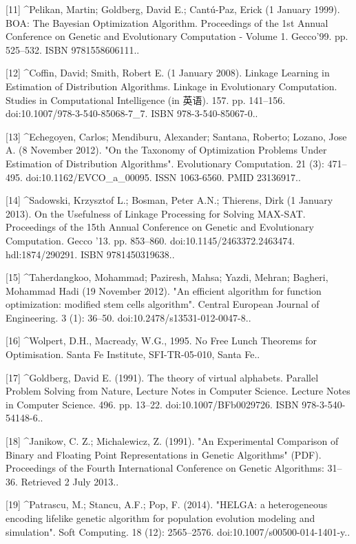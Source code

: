 [11]
^Pelikan, Martin; Goldberg, David E.; Cantú-Paz, Erick (1 January 1999). BOA: The Bayesian Optimization Algorithm. Proceedings of the 1st Annual Conference on Genetic and Evolutionary Computation - Volume 1. Gecco'99. pp. 525–532. ISBN 9781558606111..

[12]
^Coffin, David; Smith, Robert E. (1 January 2008). Linkage Learning in Estimation of Distribution Algorithms. Linkage in Evolutionary Computation. Studies in Computational Intelligence (in 英语). 157. pp. 141–156. doi:10.1007/978-3-540-85068-7_7. ISBN 978-3-540-85067-0..

[13]
^Echegoyen, Carlos; Mendiburu, Alexander; Santana, Roberto; Lozano, Jose A. (8 November 2012). "On the Taxonomy of Optimization Problems Under Estimation of Distribution Algorithms". Evolutionary Computation. 21 (3): 471–495. doi:10.1162/EVCO_a_00095. ISSN 1063-6560. PMID 23136917..

[14]
^Sadowski, Krzysztof L.; Bosman, Peter A.N.; Thierens, Dirk (1 January 2013). On the Usefulness of Linkage Processing for Solving MAX-SAT. Proceedings of the 15th Annual Conference on Genetic and Evolutionary Computation. Gecco '13. pp. 853–860. doi:10.1145/2463372.2463474. hdl:1874/290291. ISBN 9781450319638..

[15]
^Taherdangkoo, Mohammad; Paziresh, Mahsa; Yazdi, Mehran; Bagheri, Mohammad Hadi (19 November 2012). "An efficient algorithm for function optimization: modified stem cells algorithm". Central European Journal of Engineering. 3 (1): 36–50. doi:10.2478/s13531-012-0047-8..

[16]
^Wolpert, D.H., Macready, W.G., 1995. No Free Lunch Theorems for Optimisation. Santa Fe Institute, SFI-TR-05-010, Santa Fe..

[17]
^Goldberg, David E. (1991). The theory of virtual alphabets. Parallel Problem Solving from Nature, Lecture Notes in Computer Science. Lecture Notes in Computer Science. 496. pp. 13–22. doi:10.1007/BFb0029726. ISBN 978-3-540-54148-6..

[18]
^Janikow, C. Z.; Michalewicz, Z. (1991). "An Experimental Comparison of Binary and Floating Point Representations in Genetic Algorithms" (PDF). Proceedings of the Fourth International Conference on Genetic Algorithms: 31–36. Retrieved 2 July 2013..

[19]
^Patrascu, M.; Stancu, A.F.; Pop, F. (2014). "HELGA: a heterogeneous encoding lifelike genetic algorithm for population evolution modeling and simulation". Soft Computing. 18 (12): 2565–2576. doi:10.1007/s00500-014-1401-y..

